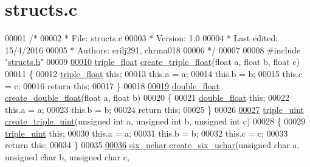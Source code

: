\hypertarget{structs_8c_source}{}\section{structs.\+c}
\label{structs_8c_source}

\begin{DoxyCode}
00001 \textcolor{comment}{/*}
00002 \textcolor{comment}{ *        File: structs.c}
00003 \textcolor{comment}{ *     Version: 1.0}
00004 \textcolor{comment}{ * Last edited: 15/4/2016 }
00005 \textcolor{comment}{ *     Authors: erilj291, chrma018}
00006 \textcolor{comment}{ */} 
00007 
00008 \textcolor{preprocessor}{#include "\hyperlink{structs_8h}{structs.h}"}
00009 
\hypertarget{structs_8c_source.tex_l00010}{}\hyperlink{structs_8h_a32f52471299d0d08c34e0dc70f2296d6}{00010} \hyperlink{structtriple__float}{triple\_float} \hyperlink{structs_8c_a32f52471299d0d08c34e0dc70f2296d6}{create\_triple\_float}(\textcolor{keywordtype}{float} a, \textcolor{keywordtype}{float} b, \textcolor{keywordtype}{float} c)
00011 \{
00012     \hyperlink{structtriple__float}{triple\_float} \textcolor{keyword}{this};
00013     this.a = a;
00014     this.b = b;
00015     this.c = c;
00016     \textcolor{keywordflow}{return} \textcolor{keyword}{this};
00017 \}
00018 
\hypertarget{structs_8c_source.tex_l00019}{}\hyperlink{structs_8h_a85207aa5455eaa4d4cf9c71e9094ae46}{00019} \hyperlink{structdouble__float}{double\_float} \hyperlink{structs_8c_a85207aa5455eaa4d4cf9c71e9094ae46}{create\_double\_float}(\textcolor{keywordtype}{float} a, \textcolor{keywordtype}{float} b)
00020 \{
00021     \hyperlink{structdouble__float}{double\_float} \textcolor{keyword}{this};
00022     this.a = a;
00023     this.b = b;
00024     \textcolor{keywordflow}{return} \textcolor{keyword}{this};
00025 \}
00026 
\hypertarget{structs_8c_source.tex_l00027}{}\hyperlink{structs_8h_a0bd229363859ac7df4e837cba6ad7ae4}{00027} \hyperlink{structtriple__uint}{triple\_uint} \hyperlink{structs_8c_a0bd229363859ac7df4e837cba6ad7ae4}{create\_triple\_uint}(\textcolor{keywordtype}{unsigned} \textcolor{keywordtype}{int} a, \textcolor{keywordtype}{unsigned} \textcolor{keywordtype}{int} b, \textcolor{keywordtype}{unsigned} \textcolor{keywordtype}{int} c)
00028 \{
00029     \hyperlink{structtriple__uint}{triple\_uint} \textcolor{keyword}{this};
00030     this.a = a;
00031     this.b = b;
00032     this.c = c;
00033     \textcolor{keywordflow}{return} \textcolor{keyword}{this};
00034 \}
00035 
\hypertarget{structs_8c_source.tex_l00036}{}\hyperlink{structs_8h_a745732bdf1500669605253e94c59c459}{00036} \hyperlink{structsix__uchar}{six\_uchar} \hyperlink{structs_8c_a745732bdf1500669605253e94c59c459}{create\_six\_uchar}(\textcolor{keywordtype}{unsigned} \textcolor{keywordtype}{char} a, \textcolor{keywordtype}{unsigned} \textcolor{keywordtype}{char} b, \textcolor{keywordtype}{unsigned} \textcolor{keywordtype}{char} c, \textcolor{keywordtype}{
}
\end{DoxyCode}
